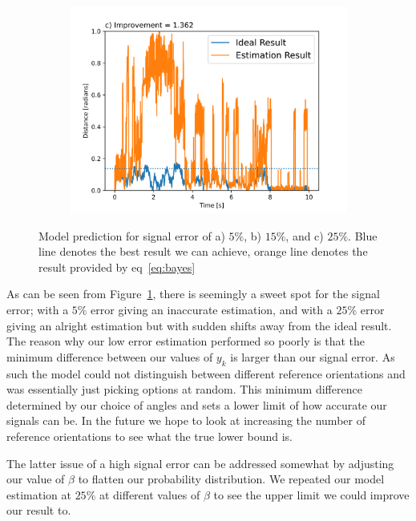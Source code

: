\documentclass[final, 3p]{elsarticle}
\begin{document}
\begin{figure}[h]
\begin{subfigure}{0.32\textwidth}
		\includegraphics[width=\textwidth]{./Images/epsilon_at_25.png}
	\end{subfigure}
	\caption{Model prediction for signal error of a) $5\%$, b) $15\%$, and c) $25\%$. Blue line denotes the best result we can achieve, orange line denotes the result provided by eq~\ref{eq:bayes}}
	\label{fig:epsilon}
\end{figure}


As can be seen from Figure~\ref{fig:epsilon}, there is seemingly a
sweet spot for the signal error; with a $5$\% error giving an
inaccurate estimation, and with a $25$\% error giving an alright
estimation but with sudden shifts away from the ideal result. The
reason why our low error estimation performed so poorly is that the
minimum difference between our values of $y_k$ is larger than our
signal error.  As such the model could not distinguish between
different reference orientations and was essentially just picking
options at random.  This minimum difference determined by our choice of
angles and sets a lower limit of how accurate our signals can be.  In
the future we hope to look at increasing the number of reference
orientations to see what the true lower bound is.

The latter issue of a high signal error can be addressed somewhat by
adjusting our value of $\beta$ to flatten our probability
distribution. We repeated our model estimation at $25\%$ at different
values of $\beta$ to see the upper limit we could improve our result
to.
\end{document}
